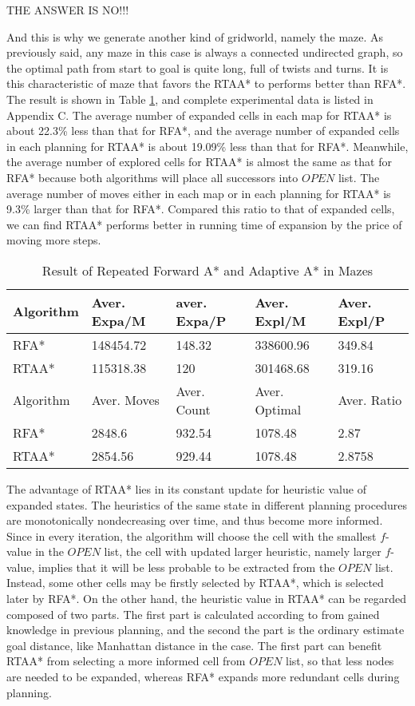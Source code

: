 THE ANSWER IS NO!!!

And this is why we generate another kind of gridworld, namely the maze. As
previously said, any maze in this case is always a connected undirected graph,
so the optimal path from start to goal is quite long, full of twists and turns.
It is this characteristic of maze that favors the RTAA* to performs better than
RFA*. The result is shown in Table \ref{tbl:rpa-rtaa2}, and complete
experimental data is listed in Appendix C. The average number of expanded cells
in each map for RTAA* is about 22.3\% less than that for RFA*, and the average
number of expanded cells in each planning for RTAA* is about 19.09\% less than
that for RFA*. Meanwhile, the average number of explored cells for RTAA* is
almost the same as that for RFA* because both algorithms will place all
successors into $OPEN$ list. The average number of moves either in each map or
in each planning for RTAA* is 9.3\% larger than that for RFA*. Compared this
ratio to that of expanded cells, we can find RTAA* performs better in running
time of expansion by the price of moving more steps.

\begin{table}[ht]
\centering
\caption{Result of Repeated Forward A* and Adaptive A* in Mazes}
\begin{tabular}{|l|l|l|l|l|}
\hline
Algorithm & Aver. Expa/M & aver. Expa/P & Aver. Expl/M & Aver. Expl/P \\
\hline
RFA* & 148454.72 & 148.32 & 338600.96 & 349.84 \\
\hline
RTAA* & 115318.38 & 120 & 301468.68 & 319.16 \\
\hhline{|=|=|=|=|=|}
Algorithm & Aver. Moves & Aver. Count & Aver. Optimal & Aver. Ratio \\
\hline
RFA* & 2848.6 & 932.54 & 1078.48 & 2.87 \\
\hline
RTAA* & 2854.56 & 929.44 & 1078.48 & 2.8758 \\
\hline
\end{tabular}
\label{tbl:rpa-rtaa2}
\end{table}

The advantage of RTAA* lies in its constant update for heuristic value of
expanded states. The heuristics of the same state in different planning
procedures are monotonically nondecreasing over time, and thus become more
informed\cite{koenig2006real}. Since in every iteration, the algorithm will
choose the cell with the smallest $f$-value in the $OPEN$ list, the cell with
updated larger heuristic, namely larger $f$-value, implies that it will be less
probable to be extracted from the $OPEN$ list. Instead, some other cells may be
firstly selected by RTAA*, which is selected later by RFA*. On the other hand,
the heuristic value in RTAA* can be regarded composed of two parts. The first
part is calculated according to from gained knowledge in previous planning, and
the second the part is the ordinary estimate goal distance, like Manhattan
distance in the case. The first part can benefit RTAA* from selecting a more
informed cell from $OPEN$ list, so that less nodes are needed to be expanded,
whereas RFA* expands more redundant cells during planning.

